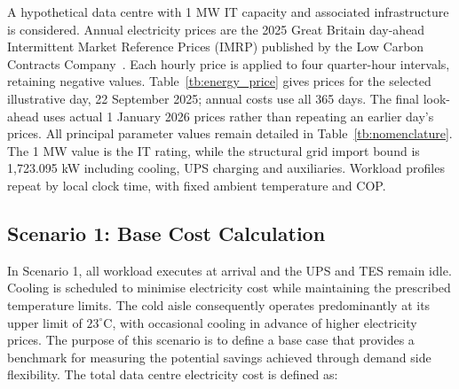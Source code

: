 \documentclass[lettersize,journal]{IEEEtran}
\begin{document}
A hypothetical data centre with 1 MW IT capacity and associated infrastructure is considered. Annual electricity prices are the 2025 Great Britain day-ahead Intermittent Market Reference Prices (IMRP) published by the Low Carbon Contracts Company~\cite{lccc_imrp_actuals}. Each hourly price is applied to four quarter-hour intervals, retaining negative values. Table~\ref{tb:energy_price} gives prices for the selected illustrative day, 22 September 2025; annual costs use all 365 days. The final look-ahead uses actual 1 January 2026 prices rather than repeating an earlier day's prices. All principal parameter values remain detailed in Table~\ref{tb:nomenclature}. The 1 MW value is the IT rating, while the structural grid import bound is 1,723.095 kW including cooling, UPS charging and auxiliaries. Workload profiles repeat by local clock time, with fixed ambient temperature and COP.

\begin{table}[!t]
\caption{Day-Ahead Reference Prices on 22 September 2025}
\label{tb:energy_price}
\centering
{}
\end{table}

\subsection{Scenario 1: Base Cost Calculation}\label{sec:scenario 1}
In Scenario 1, all workload executes at arrival and the UPS and TES remain idle. Cooling is scheduled to minimise electricity cost while maintaining the prescribed temperature limits. The cold aisle consequently operates predominantly at its upper limit of $23^\circ$C, with occasional cooling in advance of higher electricity prices. The purpose of this scenario is to define a base case that provides a benchmark for measuring the potential savings achieved through demand side flexibility. The total data centre electricity cost is defined as:
\end{document}
